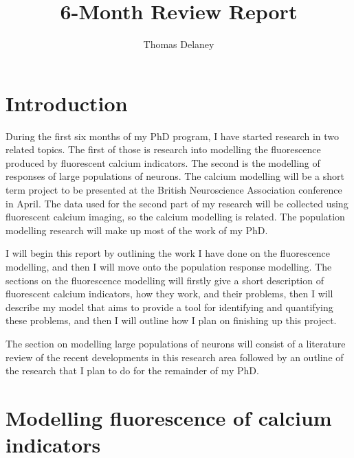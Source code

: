 \documentclass[a4paper,12pt]{article}
\title{6-Month Review Report}
\author{Thomas Delaney}
\theoremstyle{definition}
\begin{document}
\maketitle
\newpage
\tableofcontents
\newpage

\section{Introduction}
	During the first six months of my PhD program, I have started research in two related topics. The first of those is research into modelling the fluorescence produced by fluorescent calcium indicators. The second is the modelling of responses of large populations of neurons. The calcium modelling will be a short term project to be presented at the British Neuroscience Association conference in April. The data used for the second part of my research will be collected using fluorescent calcium imaging, so the calcium modelling is related. The population modelling research will make up most of the work of my PhD.
	
	I will begin this report by outlining the work I have done on the fluorescence modelling, and then I will move onto the population response modelling. The sections on the fluorescence modelling will firstly give a short description of fluorescent calcium indicators, how they work, and their problems, then I will describe my model that aims to provide a tool for identifying and quantifying these problems, and then I will outline how I plan on finishing up this project.
	
	The section on modelling large populations of neurons will consist of a literature review of the recent developments in this research area followed by an outline of the research that I plan to do for the remainder of my PhD.
	
\section{Modelling fluorescence of calcium indicators}
\end{document}
